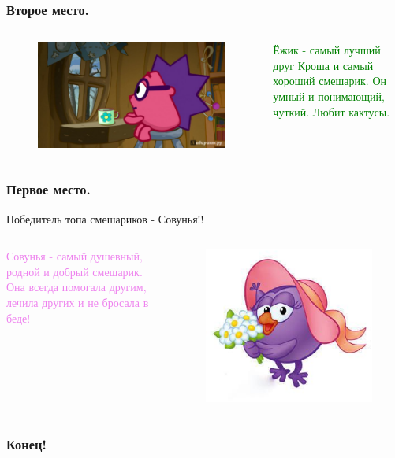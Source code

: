 \documentclass[roman, 12pt]{beamer}
\begin{document}
	\begin{frame}
		\frametitle{Второе место.}
		
		\begin {columns}
		\begin{figure}
			\includegraphics[width=0.7\linewidth]{images/ezhik}
		\end{figure}
		\textcolor{green}{Ёжик - самый лучший друг Кроша и самый хороший смешарик. Он умный и понимающий, чуткий. Любит кактусы.}
		\end {columns}
		
		\end {frame}
	
	\begin{frame}
		\frametitle{Первое место.}
		
		\begin{block}{Победитель топа смешариков - Совунья!!}
		\end{block}
		
		\begin {columns}
		\column{0.7\textwidth}
		\textcolor{violet}{Совунья - самый душевный, родной и добрый смешарик. Она всегда помогала другим, лечила других и не бросала в беде!}
		\column{0.7\textwidth}
		\begin{figure}
			\includegraphics[width=0.7\linewidth]{images/sovunia}
		\end{figure}
		\end {columns}
	
		\end {frame}
	
	\begin{frame}
		\frametitle{Конец!}
		\end {frame}
	
\end{document}
